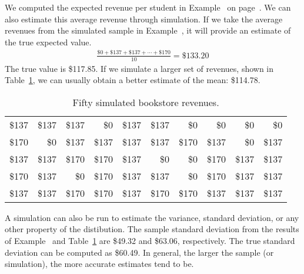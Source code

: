 We computed the expected revenue per student in Example~ on page~\pageref{revFromStudent}. We can also estimate this average revenue through simulation. If we take the average revenues from the simulated sample in Example~, it will provide an estimate of the true expected value.
\begin{eqnarray*}
\frac{\$0 + \$137 + \$137 + \cdots + \$170}{10} = \$133.20
\end{eqnarray*}
The true value is \$117.85. If we simulate a larger set of revenues, shown in Table~\ref{largeRevSim}, we can usually obtain a better estimate of the mean: \$114.78.
\begin{table}
\begin{center}
\begin{tabular}{rrrrr rrrrr}
\$137 & \$137 & \$137 & \$0 & \$137 & \hspace{0.8cm} \$137 & \$0 & \$0 & \$0 & \$0  \\
\$170 & \$0 & \$137 & \$137 & \$137 &  \$137 & \$170 & \$137 & \$0 & \$137 \\
\$137 & \$137 & \$170 & \$170 & \$137 & \$0 & \$0 & \$170 & \$137 & \$137 \\
\$170 & \$137 & \$0 & \$170 & \$137 & \$137 & \$0 & \$170 & \$137 & \$137 \\
\$137 & \$137 & \$170 & \$170 & \$137 & \$170 & \$170 & \$137 & \$137 & \$137
\end{tabular}
\end{center}
\caption{Fifty simulated bookstore revenues.}
\label{largeRevSim}
\end{table}


A simulation can also be run to estimate the variance, standard deviation, or any other property of the distibution. The sample standard deviation from the results of Example~ and Table~\ref{largeRevSim} are \$49.32 and \$63.06, respectively. The true standard deviation can be computed as \$60.49. In general, the larger the sample (or simulation), the more accurate estimates tend to be. \\

